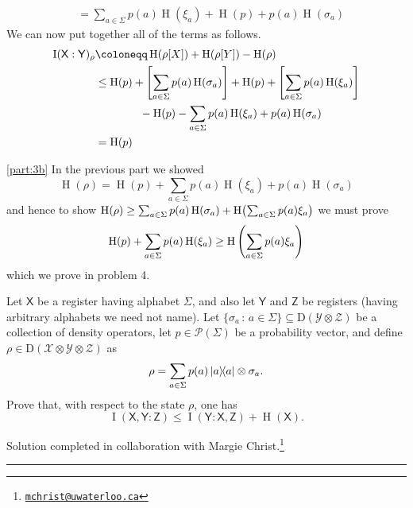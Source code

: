 \documentclass[boxes,pages,color=SeaGreen]{homework}
\newcommand{\collab}[1]{\footnote{\href{mailto:#1}{\texttt{#1}}}}
\renewcommand{\op}[1]{\operatorname{#1}}
\newcommand{\X}{\mathcal{X}}
\newcommand{\Y}{\mathcal{Y}}
\newcommand{\Z}{\mathcal{Z}}
\renewcommand{\P}{\mathcal{P}}
\newcommand{\reg}[1]{\mathsf{#1}}
\newcommand{\ent}{\operatorname{H}}
\newcommand{\Density}{\mathrm{D}}
\begin{document}
\begin{solution}
\begin{align*}
                   & = \sum_{a \in \Sigma} p(a)\ent(\xi_a) + \ent(p) + p(a)\ent(\sigma_a)
    \end{align*}
    We can now put together all of the terms as follows.
    \begin{align*}
        \op{I}(\reg{X} : \reg{Y})_\rho & \defeq \ent(\rho[X]) + \ent(\rho[Y]) - \ent(\rho)                                                                  \\
                                       & \leq \ent(p) + \qty[\sum_{a \in \Sigma} p(a)\ent(\sigma_a)] + \ent(p) + \qty[\sum_{a \in \Sigma} p(a) \ent(\xi_a)] \\
                                       & \qquad \qquad - \ent(p) - \sum_{a \in \Sigma} p(a)\ent(\xi_a) + p(a)\ent(\sigma_a)                                 \\
                                       & = \ent(p)
    \end{align*}

    \ref{part:3b}
    In the previous part we showed
    \begin{equation*}
        \ent(\rho) = \ent(p) + \sum_{a \in \Sigma} p(a)\ent(\xi_a) + p(a)\ent(\sigma_a)
    \end{equation*}
    and hence to show $\ent(\rho) \geq \sum_{a \in \Sigma} p(a)\ent(\sigma_a) + \ent\!\qty\big(\sum_{a \in \Sigma} p(a) \xi_a)$ we must prove
    \begin{equation*}
        \ent(p) + \sum_{a \in \Sigma} p(a) \ent(\xi_a) \geq \ent\qty(\sum_{a \in \Sigma} p(a) \xi_a)
    \end{equation*}
    which we prove in problem 4.
\end{solution}


\begin{problem}
Let $\reg{X}$ be a register having alphabet $\Sigma$, and also let
$\reg{Y}$ and $\reg{Z}$ be registers (having arbitrary alphabets we need
not name).
Let $\{\sigma_a\,:\,a\in\Sigma\}\subseteq\Density(\Y\otimes\Z)$
be a collection of density operators, let $p\in\P(\Sigma)$ be a probability
vector, and define $\rho\in\Density(\X\otimes\Y\otimes\Z)$ as
\[
    \rho = \sum_{a\in\Sigma} p(a) \ketbra{a} \otimes \sigma_a.
\]
Prove that, with respect to the state $\rho$, one has
\[
    \op{I}(\reg{X},\reg{Y} : \reg{Z})
    \leq \op{I}(\reg{Y}:\reg{X},\reg{Z}) + \op{H}(\reg{X}).
\]
\end{problem}

\noindent Solution completed in collaboration with Margie Christ.\collab{mchrist@uwaterloo.ca}

{\noindent\color{SeaGreen!30}\rule{\textwidth}{1.5pt}}
\end{document}

